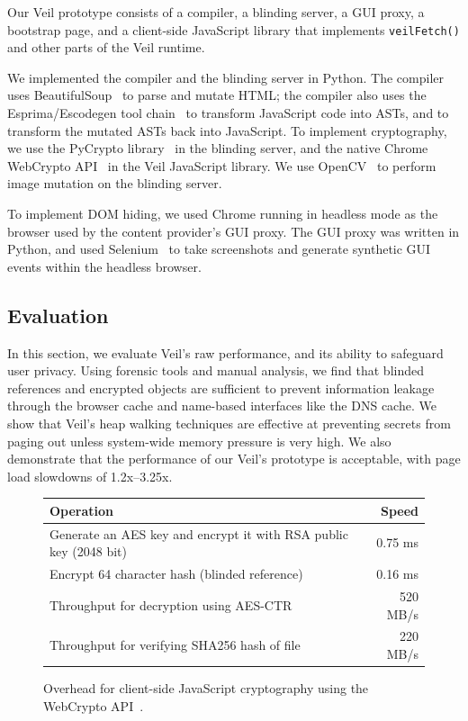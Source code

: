 Our Veil prototype consists of a compiler,
a blinding server, a GUI proxy, a bootstrap page,
and a client-side JavaScript library that
implements \texttt{veilFetch{}()}
and other parts of the Veil runtime.

We implemented the compiler and the blinding
server in Python. The compiler uses
BeautifulSoup~\cite{beautifulSoup} to
parse and mutate HTML; the compiler also
uses the Esprima/Escodegen tool chain~\cite{esprima,escodegen}
to transform JavaScript code into ASTs, and
to transform the mutated ASTs back into
JavaScript. To implement cryptography, we use the
PyCrypto library~\cite{pyCrypto}
in the blinding server, and the native
Chrome WebCrypto API~\cite{webCrypto} 
in the Veil JavaScript library. We 
use OpenCV~\cite{opencv} to perform
image mutation on the blinding server.

To implement DOM hiding, we used Chrome 
running in headless mode as the browser
used by the content provider's GUI proxy.
The GUI proxy was written in Python, and
used Selenium~\cite{selenium} to take
screenshots and generate synthetic GUI
events within the headless browser.

\subsection{Evaluation}
\label{sec:eval}

In this section, we evaluate Veil's raw
performance, and its ability to safeguard
user privacy. Using forensic tools and
manual analysis, we find that blinded
references and encrypted objects are
sufficient to prevent information leakage
through the browser cache and name-based
interfaces like the DNS cache. We show
that Veil's heap walking techniques are
effective at preventing secrets from paging
out unless system-wide memory pressure is
very high. We also demonstrate that the performance
of our Veil's prototype is acceptable, with
page load slowdowns of 1.2x--3.25x.

\begin{figure}
	\centering
	\begin{tabular}{lr}
		\toprule
		\bf Operation & \bf Speed \\
		\midrule
		Generate an AES key and encrypt it with RSA public key (2048 bit)  & 0.75 ms \\
		Encrypt 64 character hash (blinded reference) & 0.16 ms \\
		Throughput for decryption using AES-CTR & 520 MB/s \\
		Throughput for verifying SHA256 hash of file & 220 MB/s \\
		\bottomrule
	\end{tabular}
	\caption{Overhead for client-side JavaScript cryptography using the WebCrypto API~\cite{webCrypto}.}
	\label{fig:cryptoCost}
\end{figure}

